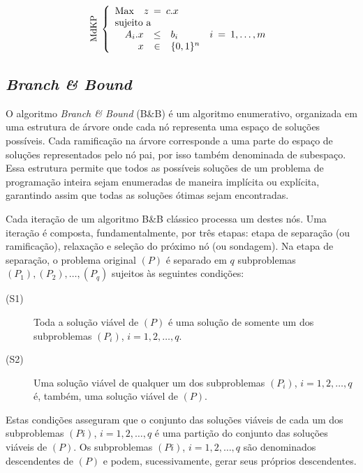 \documentclass[a4paper,10pt]{article}
\newcommand{\fw}[1]{\emph{#1}}
\begin{document}
$$
 \rotatebox[origin=c]{90}{\small MdKP} \,  \, \left\{
  \begin{array}{rrclc}
   \multicolumn{4}{l}{\mbox{Max} \quad z \> = \> c.x}    \\
   \multicolumn{4}{l}{\mbox{sujeito a}}                 \\
   & A_{i}.x & \leq & b_{i}       & i \> = \> 1,\dots, m \\
   &       x & \in  & \{0,1\}^{n} &                      \\
\end{array}
\right.
$$

\subsection{\fw{Branch \& Bound}}
\label{ssec:b&b}
O algoritmo \fw{Branch \& Bound} (B\&B) é um algoritmo enumerativo, organizada em uma
estrutura de árvore onde cada nó representa uma espaço de soluções possíveis.
Cada ramificação na árvore corresponde a uma parte do espaço de soluções
representados pelo nó pai, por isso também denominada de subespaço. Essa estrutura
permite que todos as possíveis soluções de um problema de programação inteira
sejam enumeradas de maneira implícita ou explícita, garantindo assim que todas as
soluções ótimas sejam encontradas.

Cada iteração de um algoritmo B\&B clássico processa um destes nós. Uma iteração
é composta,
fundamentalmente, por três etapas: etapa de separação (ou ramificação),
relaxação e seleção do próximo nó (ou sondagem). Na etapa de separação, o
problema original $(P)$ é
separado em $q$ subproblemas $(P_1),(P_2),\dots,(P_q)$ sujeitos às
seguintes condições:

\begin{description}
 \item[(S1)] Toda a solução viável de $(P)$ é uma solução de somente um dos subproblemas $(P_i)$, $i=1,2,\dots,q$.
 \item[(S2)] Uma solução viável de qualquer um dos subproblemas $(P_i)$, $i=1,2,\dots,q$ é, também, uma solução viável de $(P)$.
\end{description}

Estas condições asseguram que o conjunto das soluções viáveis de cada um dos subproblemas $(Pi)$, $i = 1, 2,
\dots, q$ é uma partição do conjunto das soluções viáveis de $(P)$. Os subproblemas $(Pi)$, $i = 1, 2, \dots, q$ são
denominados descendentes de $(P)$ e podem, sucessivamente, gerar seus próprios descendentes.
\end{document}
